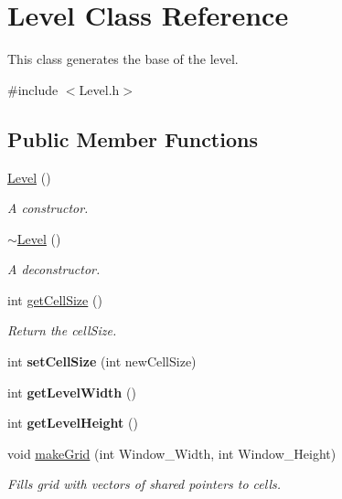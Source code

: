 \hypertarget{class_level}{}\section{Level Class Reference}
\label{class_level}


This class generates the base of the level.  




{\ttfamily \#include $<$Level.\+h$>$}

\subsection*{Public Member Functions}
\begin{DoxyCompactItemize}
\item 
\mbox{\label{class_level_a7a696c928ca5d5354db6e50e46d0f67d}} 
\hyperlink{class_level_a7a696c928ca5d5354db6e50e46d0f67d}{Level} ()
\begin{DoxyCompactList}\small\item\em A constructor. \end{DoxyCompactList}\item 
\mbox{\label{class_level_a249eac1e8f19ff44134efa5e986feaca}} 
\hyperlink{class_level_a249eac1e8f19ff44134efa5e986feaca}{$\sim$\+Level} ()
\begin{DoxyCompactList}\small\item\em A deconstructor. \end{DoxyCompactList}\item 
\mbox{\label{class_level_a0b6d16a7850bee00c1079ae6caa09658}} 
int \hyperlink{class_level_a0b6d16a7850bee00c1079ae6caa09658}{get\+Cell\+Size} ()
\begin{DoxyCompactList}\small\item\em Return the cell\+Size. \end{DoxyCompactList}\item 
\mbox{\label{class_level_a097cc355bb986141ab1293b6326fc7dd}} 
int {\bfseries set\+Cell\+Size} (int new\+Cell\+Size)
\item 
\mbox{\label{class_level_a986cd05306bcdbb9f8e1dbddab258076}} 
int {\bfseries get\+Level\+Width} ()
\item 
\mbox{\label{class_level_a78ab827c2c598cc5e9ae29af6617eee7}} 
int {\bfseries get\+Level\+Height} ()
\item 
\mbox{\label{class_level_a711767475094a647d934c11416adc732}} 
void \hyperlink{class_level_a711767475094a647d934c11416adc732}{make\+Grid} (int Window\+\_\+\+Width, int Window\+\_\+\+Height)
\begin{DoxyCompactList}\small\item\em Fills grid with vectors of shared pointers to cells. \end{DoxyCompactList}\end{DoxyCompactItemize}
